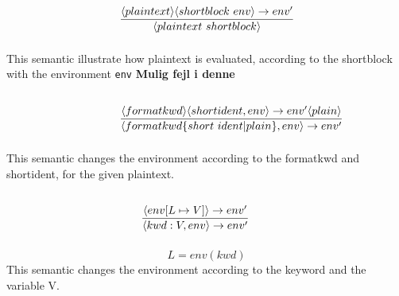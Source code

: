 \noindent{$[plain]$}
\[ \condinfrule{\langle plaintext \rangle \langle shortblock~env \rangle \ra env'} { \langle plaintext~shortblock \rangle }{} \]
This semantic illustrate how plaintext is evaluated, according to the shortblock with the environment \texttt{env} \textbf{Mulig fejl i denne}

\noindent{$[shortblock]$}
\[ \condinfrule{\langle formatkwd \rangle \langle shortident, env \rangle \ra env' \langle plain \rangle} { \langle formatkwd \{short~ident | plain\}, env \rangle \ra env'}{} \]
This semantic changes the environment according to the formatkwd and shortident, for the given plaintext.

\noindent{$[shortident]$}
\[ \condinfrule{\langle env [L \mapsto V] \rangle \ra env'} { \langle kwd : V, env \rangle \ra env'}{} \]
\[ L = env(kwd)\]
This semantic changes the environment according to the keyword and the variable V.